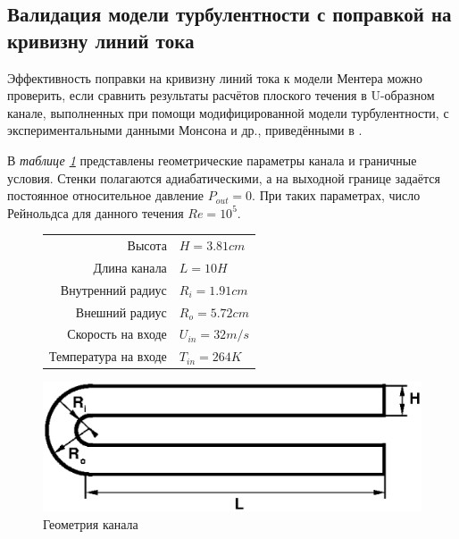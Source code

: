 \subsection{Валидация модели турбулентности с поправкой на кривизну линий тока}
\label{UDUCTComparison}

Эффективность поправки на кривизну линий тока к модели Ментера можно проверить, если сравнить результаты расчётов плоского течения в U-образном канале, выполненных при помощи модифицированной модели турбулентности, с экспериментальными данными Монсона и др., приведёнными в \cite{Monson}.

В \textit{таблице \ref{tableUDuct}} представлены геометрические параметры канала и граничные условия. Стенки полагаются адиабатическими, а на выходной границе задаётся постоянное относительное давление $P_{out} = 0$. При таких параметрах, число Рейнольдса для данного течения $Re = 10^5$.

\begin{figure}[h]
	\begin{minipage}{0.5\linewidth}
			\begin{tabular}{r l}
				\hline
				\label{tableUDuct}
				Высота & $H=3.81cm$ \\
				Длина канала & $L = 10H$ \\
				Внутренний радиус & $R_i = 1.91cm$ \\
				Внешний радиус & $R_o = 5.72cm$ \\
				Скорость на входе & $U_{in} = 32 m/s$ \\
				Температура на входе & $T_{in} = 264 K$ \\
			\end{tabular}
	\end{minipage}
	\hspace{2em}
	\begin{minipage}{0.4\linewidth}
		\begin{flushright}
		\includegraphics[scale=0.4]{UDuct}
		\caption{Геометрия канала}
		\end{flushright}
	\end{minipage}
\end{figure}

